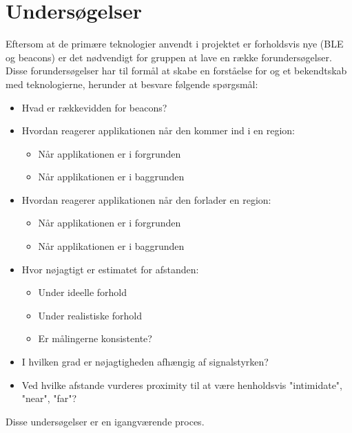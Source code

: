 \chapter{Undersøgelser}
Eftersom at de primære teknologier anvendt i projektet er forholdsvis nye (BLE og beacons) er det nødvendigt for gruppen at lave en række forundersøgelser. Disse forundersøgelser har til formål at skabe en forståelse for og et bekendtskab med teknologierne, herunder at besvare følgende spørgsmål:
\begin{itemize}
\item Hvad er rækkevidden for beacons?
\item Hvordan reagerer applikationen når den kommer ind i en region:
\begin{itemize}
\item Når applikationen er i forgrunden
\item Når applikationen er i baggrunden
\end{itemize}
\item Hvordan reagerer applikationen når den forlader en region:
\begin{itemize}
\item Når applikationen er i forgrunden
\item Når applikationen er i baggrunden
\end{itemize}
\item Hvor nøjagtigt er estimatet for afstanden:
\begin{itemize}
\item Under ideelle forhold
\item Under realistiske forhold
\item Er målingerne konsistente?
\end{itemize}
\item I hvilken grad er nøjagtigheden afhængig af signalstyrken?
\item Ved hvilke afstande vurderes proximity til at være henholdsvis "intimidate", "near", "far"?
\end{itemize}

Disse undersøgelser er en igangværende proces.